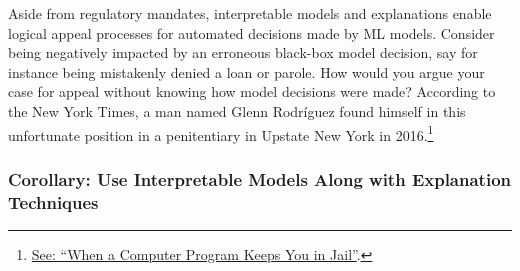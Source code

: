 \documentclass{article}
\begin{document}
Aside from regulatory mandates, interpretable models and explanations enable logical appeal processes for automated decisions made by ML models. Consider being negatively impacted by an erroneous black-box model decision, say for instance being mistakenly denied a loan or parole. How would you argue your case for appeal without knowing how model decisions were made? According to the New York Times, a man named Glenn Rodr\'iguez found himself in this unfortunate position in a penitentiary in Upstate New York in 2016.\footnote{\scriptsize{\href{https://www.nytimes.com/2017/06/13/opinion/how-computers-are-harming-criminal-justice.html}{See: ``When a Computer Program Keeps You in Jail''}.}}

\subsubsection{Corollary: Use Interpretable Models Along with Explanation Techniques} \label{cor:int_ex}
\end{document}
